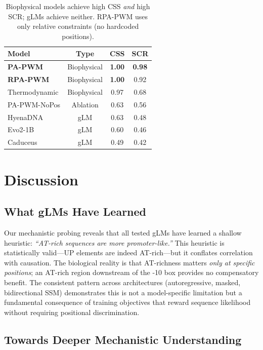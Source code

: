 \documentclass{article}
\begin{document}
\begin{table}[ht]
\caption{Biophysical models achieve high CSS \textit{and} high SCR; gLMs achieve neither. RPA-PWM uses only relative constraints (no hardcoded positions).}
\label{tab:biophysical}
\vskip 0.05in
\begin{center}
\small
\begin{tabular}{lccc}
\toprule
Model & Type & CSS & SCR \\
\midrule
\textbf{PA-PWM} & Biophysical & \textbf{1.00} & \textbf{0.98} \\
\textbf{RPA-PWM} & Biophysical & \textbf{1.00} & 0.92 \\
Thermodynamic & Biophysical & 0.97 & 0.68 \\
\midrule
PA-PWM-NoPos & Ablation & 0.63 & 0.56 \\
\midrule
HyenaDNA & gLM & 0.63 & 0.48 \\
Evo2-1B & gLM & 0.60 & 0.46 \\
Caduceus & gLM & 0.49 & 0.42 \\
\bottomrule
\end{tabular}
\end{center}
\vskip -0.1in
\end{table}

\section{Discussion}
\label{sec:discussion}

\subsection{What gLMs Have Learned}

Our mechanistic probing reveals that all tested gLMs have learned a shallow heuristic: \textit{``AT-rich sequences are more promoter-like.''} This heuristic is statistically valid---UP elements are indeed AT-rich---but it conflates correlation with causation. The biological reality is that AT-richness matters \textit{only at specific positions}; an AT-rich region downstream of the -10 box provides no compensatory benefit. The consistent pattern across architectures (autoregressive, masked, bidirectional SSM) demonstrates this is not a model-specific limitation but a fundamental consequence of training objectives that reward sequence likelihood without requiring positional discrimination.

\subsection{Towards Deeper Mechanistic Understanding}
\end{document}
